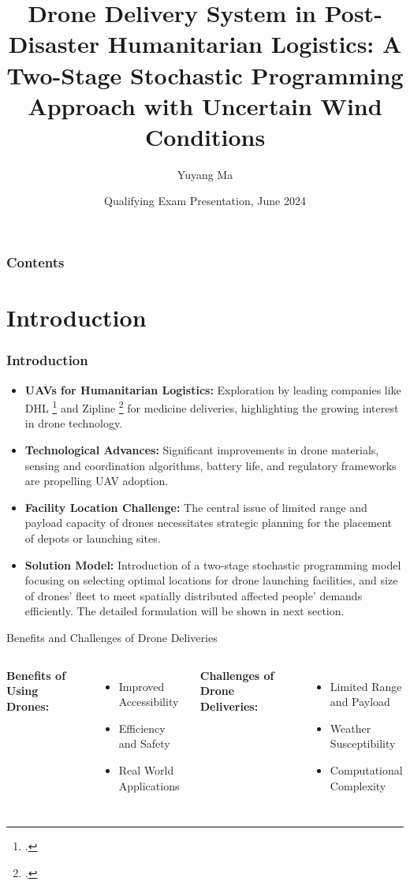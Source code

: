 \documentclass[aspectratio=169]{beamer}
\title[Facility Location w. Drones] %
{Drone Delivery System in Post-Disaster Humanitarian Logistics: A
Two-Stage Stochastic Programming Approach with Uncertain Wind
Conditions}
\author[Yuyang Ma] %
{Yuyang Ma}
\institute[ISE] %
{
  Department of Industrial and Systems Engineering\\
  Lehigh University
}
\date[Jun 13 2024] %
{Qualifying Exam Presentation, June 2024}
\begin{document}
\newcommand{\hltblue}[1]{\textcolor{blue}{#1}}
\newcommand{\hltred}[1]{\textcolor{red}{#1}}

\frame{\titlepage}
\begin{frame}
\frametitle{Contents}
\tableofcontents
\end{frame}
\section{Introduction}
\begin{frame}
    \frametitle{Introduction}
    \begin{itemize}
      \item \textbf{UAVs for Humanitarian Logistics:} Exploration by leading companies like DHL \footcite{dhl2018drone} and Zipline \footcite{Zipline2020} for medicine deliveries, highlighting the growing interest in drone technology.
      \item \textbf{Technological Advances:} Significant improvements in drone materials, sensing and coordination algorithms, battery life, and regulatory frameworks are propelling UAV adoption.
      \item \textbf{Facility Location Challenge:} The central issue of limited range and payload capacity of drones necessitates strategic planning for the placement of depots or launching sites.
      \item \textbf{Solution Model:} Introduction of a two-stage stochastic programming model focusing on selecting optimal locations for drone launching facilities, and size of drones' fleet to meet spatially distributed affected people' demands efficiently. The detailed formulation will be shown in next section.
    \end{itemize}
\end{frame}

\begin{frame}{Benefits and Challenges of Drone Deliveries}
  \begin{columns}
    \textbf{Benefits of Using Drones:}
    \begin{itemize}
      \item Improved Accessibility
      \item Efficiency and Safety
      \item Real World Applications
    \end{itemize}
    
    \textbf{Challenges of Drone Deliveries:}
    \begin{itemize}
      \item Limited Range and Payload
      \item Weather Susceptibility
      \item Computational Complexity
    \end{itemize}
  \end{columns}
\end{frame}
\end{document}
